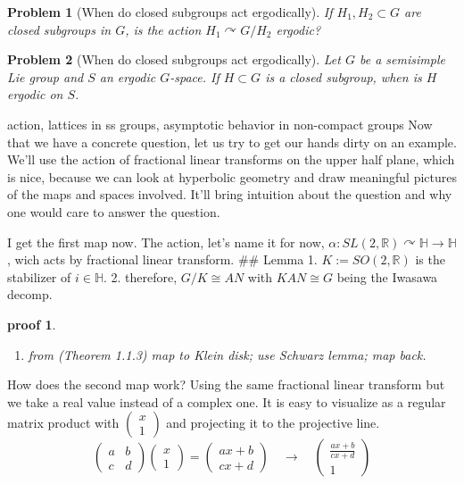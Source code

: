 \documentclass[
  12pt
]{article}
\providecommand{\tightlist}{%
  \setlength{\itemsep}{0pt}\setlength{\parskip}{0pt}}
\theoremstyle{break}
\newtheorem*{problem}{Problem}
\theoremstyle{plain}
\newtheorem*{pf}{proof}
\newcommand{\G}{\ensuremath{G}\xspace}
\begin{document}
  \begin{problem}[When do closed subgroups act ergodically]
    If $H_1, H_2 \subset G$ are closed subgroups in \G, is the action $H_1\curvearrowright G/H_2$ ergodic?
  \end{problem}

  \begin{problem}[When do closed subgroups act ergodically]
    Let \G be a semisimple Lie group and $S$ an ergodic \G-space. If $H\subset G$ is a closed subgroup, when is $H$ ergodic on $S$.
  \end{problem}


  action, lattices in ss groups, asymptotic behavior in non-compact groups
  \cite{howe79}
  Now that we have a concrete question, let us try to get our hands dirty
  on an example. We'll use the action of fractional linear transforms on
  the upper half plane, which is nice, because we can look at hyperbolic
  geometry and draw meaningful pictures of the maps and spaces involved.
  It'll bring intuition about the question and why one would care to
  answer the question.

  I get the first map now. The action, let's name it for now,
  $\alpha : SL(2, \mathbb{R}) \curvearrowright \mathbb{H} \rightarrow \mathbb{H}$,
  wich acts by fractional linear transform. \#\# Lemma 1.
  $K:= SO(2, \mathbb{R})$ is the stabilizer of $i \in \mathbb{H}$. 2.
  therefore, $G/K \cong AN$ with $KAN \cong G$ being the Iwasawa
  decomp.

  \begin{pf}\label{pf:miyake}
  \begin{enumerate}
  \def\labelenumi{\arabic{enumi}.}
  \tightlist
  \item
    from \cite{Miyake89}(Theorem 1.1.3) map to Klein disk; use Schwarz
    lemma; map back.
  \end{enumerate}
  \end{pf}

  How does the second map work? Using the same fractional linear transform
  but we take a real value instead of a complex one. It is easy to
  visualize as a regular matrix product with
  $\begin{pmatrix}x \\ 1\end{pmatrix}$ and projecting it to the
  projective line. \[
  \begin{pmatrix}a & b \\ c & d\end{pmatrix}\begin{pmatrix}x \\ 1\end{pmatrix} =
  \begin{pmatrix}ax + b \\ cx + d\end{pmatrix} \quad \rightarrow \quad
  \begin{pmatrix}\frac{ax + b}{cx + d} \\ 1\end{pmatrix}
  \] 
\end{document}
